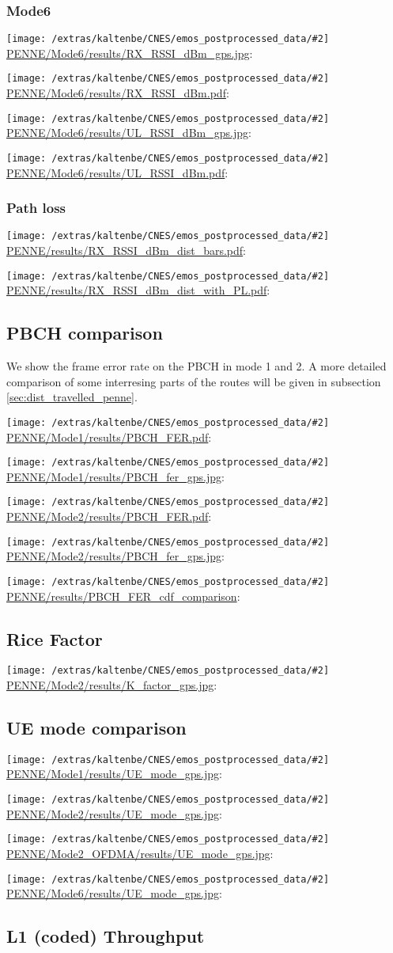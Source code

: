 \documentclass[a4paper,10pt]{article}
\newcommand{\printfile}[2][]{
 \begin{minipage}{8cm}
  \centering
  \texttt{[image: /extras/kaltenbe/CNES/emos\_postprocessed\_data/\#2]}
  \url{#2}: #1

 \end{minipage}
}
\begin{document}
\subsubsection{Mode6}
\printfile{PENNE/Mode6/results/RX_RSSI_dBm_gps.jpg}
\printfile{PENNE/Mode6/results/RX_RSSI_dBm.pdf}

\printfile{PENNE/Mode6/results/UL_RSSI_dBm_gps.jpg}
\printfile{PENNE/Mode6/results/UL_RSSI_dBm.pdf}

\subsubsection{Path loss}

\printfile{PENNE/results/RX_RSSI_dBm_dist_bars.pdf}
\printfile{PENNE/results/RX_RSSI_dBm_dist_with_PL.pdf}


\subsection{PBCH comparison}
We show the frame error rate on the PBCH in mode 1 and 2. A more detailed comparison of some interresing parts of the routes will be given in subsection \ref{sec:dist_travelled_penne}.

\printfile{PENNE/Mode1/results/PBCH_FER.pdf}
\printfile{PENNE/Mode1/results/PBCH_fer_gps.jpg}

\printfile{PENNE/Mode2/results/PBCH_FER.pdf}
\printfile{PENNE/Mode2/results/PBCH_fer_gps.jpg}

\printfile{PENNE/results/PBCH_FER_cdf_comparison}

\subsection{Rice Factor}

\printfile{PENNE/Mode2/results/K_factor_gps.jpg}

\subsection{UE mode comparison}

\printfile{PENNE/Mode1/results/UE_mode_gps.jpg}
\printfile{PENNE/Mode2/results/UE_mode_gps.jpg}

\printfile{PENNE/Mode2_OFDMA/results/UE_mode_gps.jpg}
\printfile{PENNE/Mode6/results/UE_mode_gps.jpg}

\subsection{L1 (coded) Throughput}
\end{document}
